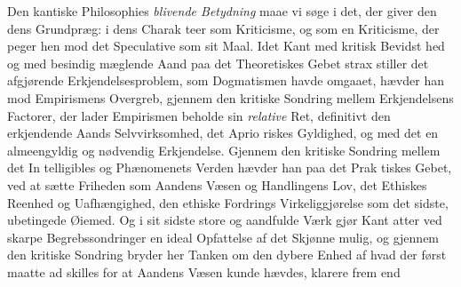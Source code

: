 \documentclass[12pt,a4paper]{book}
\begin{document}
Den kantiske Philosophies \emph{blivende Betydning} maae
vi søge i det, der giver den dens Grundpræg: i dens Charak\-%
teer som Kriticisme, og som en Kriticisme, der peger hen mod
det Speculative som sit Maal. Idet Kant med kritisk Bevidst\-%
hed og med besindig mæglende Aand paa det Theoretiskes
Gebet strax stiller det afgjørende Erkjendelsesproblem, som
Dogmatismen havde omgaaet, hævder han mod Empirismens
Overgreb, gjennem den kritiske Sondring mellem Erkjendelsens
Factorer, der lader Empirismen beholde sin \emph{relative} Ret,
definitivt den erkjendende Aands Selvvirksomhed, det Aprio\-%
riskes Gyldighed, og med det en almeengyldig og nødvendig
Erkjendelse. Gjennem den kritiske Sondring mellem det In\-%
telligibles og Phænomenets Verden hævder han paa det Prak\-%
tiskes Gebet, ved at sætte Friheden som Aandens Væsen og
Handlingens Lov, det Ethiskes Reenhed og Uafhængighed, den
ethiske Fordrings Virkeliggjørelse som det sidste, ubetingede
Øiemed. Og i sit sidste store og aandfulde Værk gjør Kant
atter ved skarpe Begrebssondringer en ideal Opfattelse af det
Skjønne mulig, og gjennem den kritiske Sondring bryder her
Tanken om den dybere Enhed af hvad der først maatte ad\-%
skilles for at Aandens Væsen kunde hævdes, klarere frem end
\end{document}
